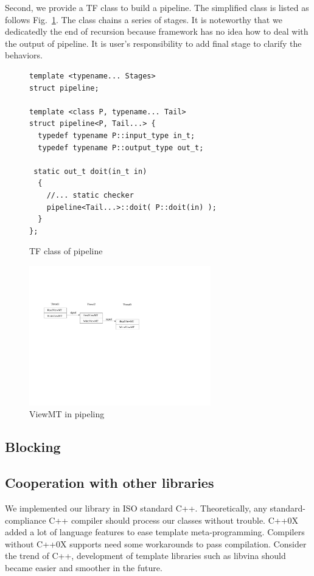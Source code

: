 \documentclass[10pt, conference, compsocconf]{IEEEtran}
\begin{document}
Second, we provide a TF class to
build a pipeline. The simplified class is listed as follows
Fig.~\ref{lst:pipe}. The class chains a series of stages. It is noteworthy
that we dedicatedly the end of recursion because framework has no idea
how to deal with the output of pipeline. It is user's responsibility
to add final stage to clarify the behaviors. 

\begin{figure}[!htp]
\begin{minipage}[tb]{\linewidth}
\makebox[\textwidth]{\hrulefill}
\begin{small}
\begin{verbatim}
template <typename... Stages>
struct pipeline;

template <class P, typename... Tail>
struct pipeline<P, Tail...> {
  typedef typename P::input_type in_t;
  typedef typename P::output_type out_t;
 
 static out_t doit(in_t in)
  {
    //... static checker
    pipeline<Tail...>::doit( P::doit(in) );
  }
};  
\end{verbatim}
\end{small}
\vspace{-1ex}\makebox[\textwidth]{\hrulefill}
\end{minipage}
\caption{TF class of pipeline}\label{lst:pipe}
\end{figure}

\begin{figure}[htp]
\includegraphics[width=3.1in]{viewmt}
\caption{ViewMT in pipeling}\label{fig:viewmt}
\end{figure}


\subsection{Blocking}
\subsection{Cooperation with other libraries}
We implemented our library in ISO standard C++. Theoretically, any standard-compliance C++ compiler should process our classes without trouble. C++0X \cite{b17} added a lot of language features to ease template meta-programming. Compilers without C++0X supports need some workarounds to pass compilation. Consider the trend of C++, development of template libraries such as libvina should became easier and smoother in the future. 
\end{document}
